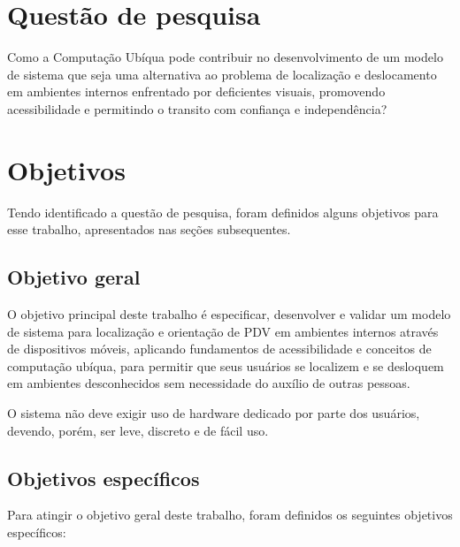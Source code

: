 \documentclass[english,brazilian]{UNISINOSmonografia}
\begin{document}
	\section{Questão de pesquisa}
	Como a Computação Ubíqua pode contribuir no desenvolvimento de um modelo de sistema que seja uma alternativa ao problema de localização e deslocamento em ambientes internos enfrentado por deficientes visuais, promovendo acessibilidade e permitindo o transito com confiança e independência?

	\section{Objetivos}
	Tendo identificado a questão de pesquisa, foram definidos alguns objetivos para esse trabalho, apresentados nas seções subsequentes.
	
		\subsection{Objetivo geral}
		O objetivo principal deste trabalho é especificar, desenvolver e validar um modelo de sistema para localização e orientação de PDV em ambientes internos através de dispositivos móveis, aplicando fundamentos de acessibilidade e conceitos de computação ubíqua, para permitir que seus usuários se localizem e se desloquem em ambientes desconhecidos sem necessidade do auxílio de outras pessoas.

		O sistema não deve exigir uso de hardware dedicado por parte dos usuários, devendo, porém, ser leve, discreto e de fácil uso.
		
		\subsection{Objetivos específicos}
		Para atingir o objetivo geral deste trabalho, foram definidos os seguintes objetivos específicos:
\end{document}
